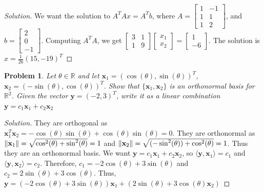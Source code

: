 \documentclass[oneside]{book}
\theoremstyle{mystyle}
\newtheorem{problem}{Problem}[section]
\DeclarePairedDelimiter\norm{\lVert}{\rVert}
\begin{document}
\begin{proof}[Solution]
We want the solution to $A^T A x = A^T b$, where $A = \begin{bmatrix} 1 & -1 \\ 1 & 1 \\ 1 & 2 \end{bmatrix}$, and $b = \begin{bmatrix} 2\\0\\-1\end{bmatrix}$. Computing $A^T A$, we get $\begin{bmatrix} 3 & 1 \\ 1 & 9 \end{bmatrix} \begin{bmatrix} x_1 \\ x_2 \end{bmatrix} = \begin{bmatrix} 1 \\ -6 \end{bmatrix}$. The solution is $x = \frac{1}{26}(15,-19)^T$
\end{proof}
\begin{problem}
Let $\theta\in\mathbb{R}$ and let $\mathbf{x}_1 = (\cos(\theta), \sin(\theta))^{T}$, $\mathbf{x}_2 = (-\sin(\theta), \cos(\theta))^{T}$. Show that $\{\mathbf{x}_1,\mathbf{x}_2\}$ is an orthonormal basis for $\mathbb{R}^2$. Given the vector $\mathbf{y} = (-2, 3)^{T}$, write it as a linear combination $\mathbf{y} = c_1 \mathbf{x}_1+c_2\mathbf{x}_2$
\end{problem}
\begin{proof}[Solution]
They are orthogonal as $\mathbf{x}_1^T \mathbf{x}_2 = -\cos(\theta)\sin(\theta) + \cos(\theta)\sin(\theta) = 0$. They are orthonormal as $\norm{\mathbf{x}_1} = \sqrt{\cos^2(\theta)+\sin^2(\theta)} = 1$ and $\norm{\mathbf{x}_2} = \sqrt{(-\sin^2(\theta))+\cos^2(\theta)}=1$. Thus they are an orthonormal basis. We want $\mathbf{y} = c_1 \mathbf{x}_1 + c_2 \mathbf{x}_2$, so $\langle \mathbf{y}, \mathbf{x}_{1}\rangle = c_{1}$ and $\langle \mathbf{y},\mathbf{x}_{2}\rangle = c_{2}$. Therefore, $c_1 = -2\cos(\theta)+3\sin(\theta)$ and $c_2 = 2\sin(\theta)+3\cos(\theta)$. Thus, $\mathbf{y} = (-2\cos(\theta)+3\sin(\theta))\mathbf{x}_1 + (2\sin(\theta)+3\cos(\theta)\mathbf{x}_2)$
\end{proof}
\end{document}
